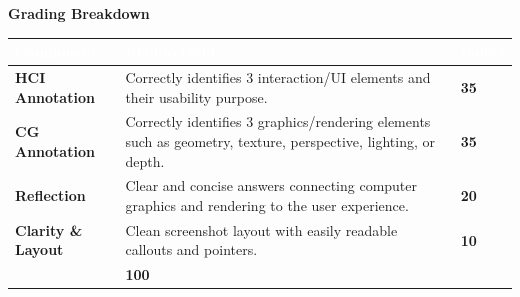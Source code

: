 \documentclass[12pt,a4paper,landscape]{article}
\begin{document}

\vspace{0.22cm}

\begin{center}

{\color{DarkBlue}
\fontsize{15}{18}\selectfont
\bfseries
Grading Breakdown
}

\vspace{0.10cm}

\renewcommand{\arraystretch}{1.25}

\begin{tabular}{
    |>{\raggedright\arraybackslash}p{4.0cm}
    |>{\raggedright\arraybackslash}p{16.8cm}
    |>{\centering\arraybackslash}p{1.6cm}|
}

\hline

\rowcolor{DarkBlue}

\textcolor{White}{\bfseries Component}
&
\textcolor{White}{\bfseries Requirement}
&
\textcolor{White}{\bfseries Points}
\\

\hline

\textbf{HCI Annotation}
&
Correctly identifies 3 interaction/UI elements and
their usability purpose.
&
\textbf{35}
\\

\hline

\textbf{CG Annotation}
&
Correctly identifies 3 graphics/rendering elements
such as geometry, texture, perspective, lighting,
or depth.
&
\textbf{35}
\\

\hline

\textbf{Reflection}
&
Clear and concise answers connecting computer graphics
and rendering to the user experience.
&
\textbf{20}
\\

\hline

\textbf{Clarity \& Layout}
&
Clean screenshot layout with easily readable callouts
and pointers.
&
\textbf{10}
\\

\hline

\multicolumn{2}{|r|}{\textbf{TOTAL}}
&
\textbf{100}
\\

\hline

\end{tabular}

\end{center}


\end{document}

